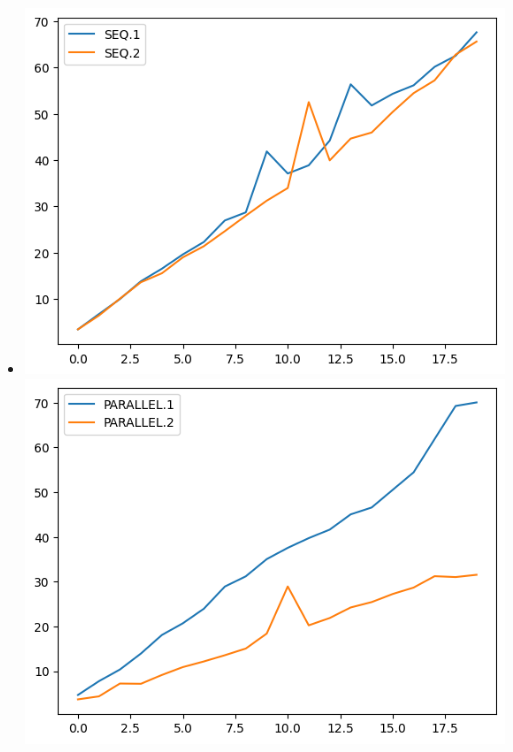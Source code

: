 \documentclass[10pt, a4paper]{article}
\begin{document}
\begin{itemize}
    \item \includegraphics[scale=0.6]{graphs/3.png}
    \includegraphics[scale=0.6]{graphs/4.png}
\end{itemize}
\end{document}
